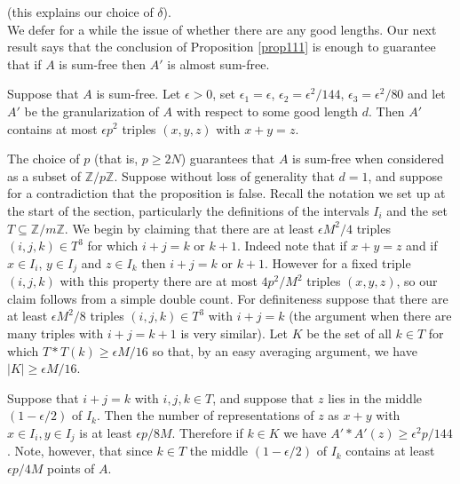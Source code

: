 \documentclass[a4paper,12pt]{article}
\begin{document}
    (this explains our choice of $\delta $). \endproof\\[11pt]
We defer for a while the issue of whether there are any good lengths. Our next result says that the conclusion of Proposition \ref{prop111} is enough to guarantee that if $A$ is sum-free then $A'$ is almost sum-free.
\begin{propositionenv}\label{almostsum-free}
Suppose that $A$ is sum-free. Let $\epsilon > 0$, set $\epsilon_1 = \epsilon$, $\epsilon_2 = \epsilon^2/144$, $\epsilon_3 = \epsilon^2/80$ and let $A'$ be the granularization of $A$ with respect to some good length $d$. Then $A'$ contains at most $\epsilon p^2$ triples $(x,y,z)$ with $x + y = z$.
\end{propositionenv}
\proof 
The choice of $p$ (that is, $p \geq 2N$) guarantees that $A$ is sum-free when considered as a subset of $\mathbb{Z}/p\mathbb{Z}$. Suppose without loss of generality that $d = 1$, and suppose for a contradiction that the proposition is false. Recall the notation we set up at the start of the section, particularly the definitions of the intervals $I_i$ and the set $T \subseteq \mathbb{Z}/m\mathbb{Z}$. We begin by claiming that there are at least $\epsilon M^2/4$ triples $(i,j,k) \in T^3$ for which $i + j = k$ or $k + 1$. Indeed note that if $x + y = z$ and if $x \in I_i$, $y \in I_j$ and $z \in I_k$ then $i + j = k$ or $k + 1$. However for a fixed triple $(i,j,k)$ with this property there are at most $4p^2/M^2$ triples $(x,y,z)$, so our claim follows from a simple double count.
For definiteness suppose that there are at least $\epsilon M^2/8$ triples $(i,j,k) \in T^3$ with $i + j = k$ (the argument when there are many triples with $i + j = k + 1$ is very similar). Let $K$ be the set of all $k \in T$ for which $T \ast T(k) \geq \epsilon M/16$ so that, by an easy averaging argument, we have $|K| \geq \epsilon M /16$.

Suppose that $i + j = k$ with $i,j,k \in T$, and suppose that $z$ lies in the middle $(1 - \epsilon/2)$ of $I_k$. Then the number of representations of $z$ as $x + y$ with $x \in I_i,y\in I_j$ is at least $\epsilon p/8M$. Therefore if $k \in K$ we have $A' \ast A'(z) \geq \epsilon^2 p/144$. Note, however, that since $k \in T$ the middle $(1 - \epsilon/2)$ of $I_k$ contains at least $\epsilon p/4M$ points of $A$. 
\end{document}

